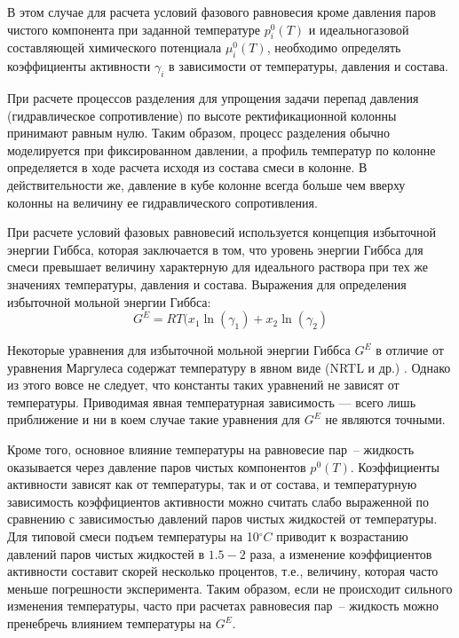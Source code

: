 В этом случае для расчета условий фазового равновесия кроме давления паров чистого компонента при заданной температуре $p_i^0(T)$ и идеальногазовой составляющей химического потенциала $\mu_i^0(T)$, необходимо определять коэффициенты активности $\gamma_i$ в зависимости от температуры, давления и состава.

При расчете процессов разделения для упрощения задачи перепад давления (гидравлическое сопротивление) по высоте ректификационной колонны принимают равным нулю. Таким образом, процесс разделения обычно моделируется при фиксированном давлении, а профиль температур по колонне определяется в ходе расчета исходя из состава смеси в колонне. В действительности же, давление в кубе колонне всегда больше чем вверху колонны на величину ее гидравлического сопротивления. 

При расчете условий фазовых равновесий используется концепция избыточной энергии Гиббса, которая заключается в том, что уровень энергии Гиббса для смеси превышает величину характерную для идеального раствора при тех же значениях температуры, давления и состава. Выражения для определения избыточной мольной энергии Гиббса:
\begin{equation}
	G^E=RT(x_1\ln (\gamma_1) +x_2 \ln(\gamma_2)
\end{equation}

Некоторые уравнения для избыточной мольной энергии Гиббса $G^E$ в отличие от уравнения Маргулеса содержат температуру в явном виде (NRTL и др.) \cite{rid1982,yelles1989}. Однако из этого вовсе не следует, что константы таких уравнений не зависят от температуры. Приводимая явная температурная зависимость --- всего лишь приближение и ни в коем случае такие уравнения для $G^E$ не являются точными.

Кроме того, основное влияние температуры на равновесие пар~-- жидкость оказывается через давление паров чистых компонентов $p^0(T)$. Коэффициенты активности зависят как от температуры, так и от состава, и температурную зависимость коэффициентов активности можно считать слабо выраженной по сравнению с зависимостью давлений паров чистых жидкостей от температуры. Для типовой смеси подъем температуры на 10$\mathrm{^\circ}C$ приводит к возрастанию давлений паров чистых жидкостей в $1.5 - 2$ раза, а изменение коэффициентов активности составит скорей несколько процентов, т.е., величину, которая часто меньше погрешности эксперимента. Таким образом, если не происходит сильного изменения температуры, часто при расчетах равновесия пар~-- жидкость можно пренебречь влиянием температуры на $G^E$.
 

